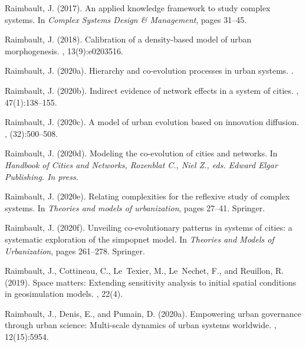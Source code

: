 \documentclass[10pt]{article}
\begin{document}
\begin{thebibliography}{}
Raimbault, J. (2017).
\newblock An applied knowledge framework to study complex systems.
\newblock In {\em Complex Systems Design \& Management}, pages 31--45.

Raimbault, J. (2018).
\newblock Calibration of a density-based model of urban morphogenesis.
, 13(9):e0203516.

Raimbault, J. (2020a).
\newblock Hierarchy and co-evolution processes in urban systems.
.

Raimbault, J. (2020b).
\newblock Indirect evidence of network effects in a system of cities.
,
  47(1):138--155.

Raimbault, J. (2020c).
\newblock A model of urban evolution based on innovation diffusion.
, (32):500--508.

Raimbault, J. (2020d).
\newblock Modeling the co-evolution of cities and networks.
\newblock In {\em Handbook of Cities and Networks, Rozenblat C., Niel Z., eds.
  Edward Elgar Publishing. In press}.

Raimbault, J. (2020e).
\newblock Relating complexities for the reflexive study of complex systems.
\newblock In {\em Theories and models of urbanization}, pages 27--41. Springer.

Raimbault, J. (2020f).
\newblock Unveiling co-evolutionary patterns in systems of cities: a systematic
  exploration of the simpopnet model.
\newblock In {\em Theories and Models of Urbanization}, pages 261--278.
  Springer.

Raimbault, J., Cottineau, C., Le~Texier, M., Le~Nechet, F., and Reuillon, R.
  (2019).
\newblock Space matters: Extending sensitivity analysis to initial spatial
  conditions in geosimulation models.
, 22(4).

Raimbault, J., Denis, E., and Pumain, D. (2020a).
\newblock Empowering urban governance through urban science: Multi-scale
  dynamics of urban systems worldwide.
, 12(15):5954.


\end{thebibliography}
\end{document}
